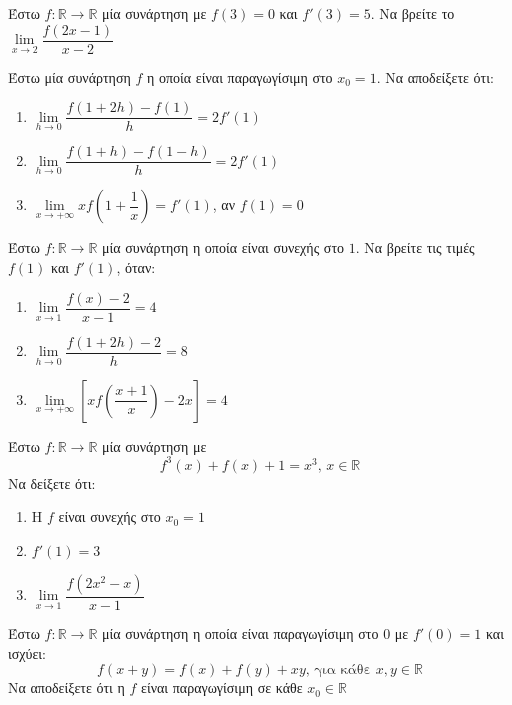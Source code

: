 \documentclass{presentation}
\begin{document}
\begin{askisi}
    Έστω $f:\mathbb{R}\to\mathbb{R}$ μία συνάρτηση με $f(3)=0$ και $f'(3)=5$. Να βρείτε το $\lim\limits_{x \to 2}{ \dfrac{f(2x-1)}{x-2} }$

\end{askisi}

\begin{askisi}
    Έστω μία συνάρτηση $f$ η οποία είναι παραγωγίσιμη στο $x_0=1$. Να αποδείξετε ότι:
    \begin{enumerate}
        \item<1-> $\lim\limits_{h \to 0}{ \dfrac{f(1+2h)-f(1)}{h} }=2f'(1)$
        \item<2-> $\lim\limits_{h \to 0}{ \dfrac{f(1+h)-f(1-h)}{h} }=2f'(1)$
        \item<3-> $\lim\limits_{x \to +\infty}{ xf\left( 1+\dfrac{1}{x} \right) }=f'(1)$, αν $f(1)=0$
    \end{enumerate}

\end{askisi}

\begin{askisi}
    Έστω $f:\mathbb{R}\to\mathbb{R}$ μία συνάρτηση η οποία είναι συνεχής στο $1$. Να βρείτε τις τιμές $f(1)$ και $f'(1)$, όταν:
    \begin{enumerate}
        \item<1-> $\lim\limits_{x \to 1}{ \dfrac{f(x)-2}{x-1} }=4$
        \item<2-> $\lim\limits_{h \to 0}{ \dfrac{f(1+2h)-2}{h} }=8$
        \item<3-> $\lim\limits_{x \to +\infty}{ \left[ xf\left( \dfrac{x+1}{x} \right)-2x   \right]=4  }$
    \end{enumerate}

\end{askisi}

\begin{askisi}
    Έστω $f:\mathbb{R}\to\mathbb{R}$ μία συνάρτηση με
    $$f^3(x)+f(x)+1=x^3 \text{, } x\in\mathbb{R}$$
    Να δείξετε ότι:
    \begin{enumerate}
        \item<1-> Η $f$ είναι συνεχής στο $x_0=1$
        \item<2-> $f'(1)=3$
        \item<3-> $\lim\limits_{x \to 1}{ \dfrac{f(2x^2-x)}{x-1}  }$
    \end{enumerate}

\end{askisi}

\begin{askisi}
    Έστω $f:\mathbb{R}\to\mathbb{R}$ μία συνάρτηση η οποία είναι παραγωγίσιμη στο $0$ με $f'(0)=1$ και ισχύει:
    $$f(x+y)=f(x)+f(y)+xy \text{, για κάθε } x,y\in\mathbb{R}$$
    Να αποδείξετε ότι η $f$ είναι παραγωγίσιμη σε κάθε $x_0\in\mathbb{R}$

\end{askisi}
\end{document}
